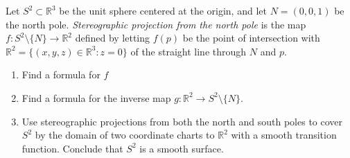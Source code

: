 \documentclass{jhwhw}
\newcommand{\R}{{\mathbb R}}
\begin{document}
\problem{}%
Let $S^2\subset \mathbb{R}^3$ be the unit sphere centered at the origin, and  let $N = (0,0,1)$ be the north pole.  \emph{Stereographic  projection from the north pole} is the map   $f:S^2\setminus\{N\}\to\mathbb{R}^2$ defined by letting  $f(p)$ be the point of intersection with $\mathbb{R}^2 = \{(x,y,z)\in\mathbb{R}^3:z=0\}$ of the straight line through $N$ and $p$.  
\begin{enumerate}
	\item Find a formula for $f$
	\item Find a formula for the inverse map $g:\mathbb{R}^2\to S^2\setminus 
	\{N\}$. 
	\item
	Use stereographic projections from both the north and south poles to cover $S^2$ by the domain of two coordinate charts to $\R^2$ with a smooth transition function.  Conclude that $S^2$ is a smooth surface.
\end{enumerate} 

\solution{}

\part{}%
\part{}%
\part{}%
\end{document}

